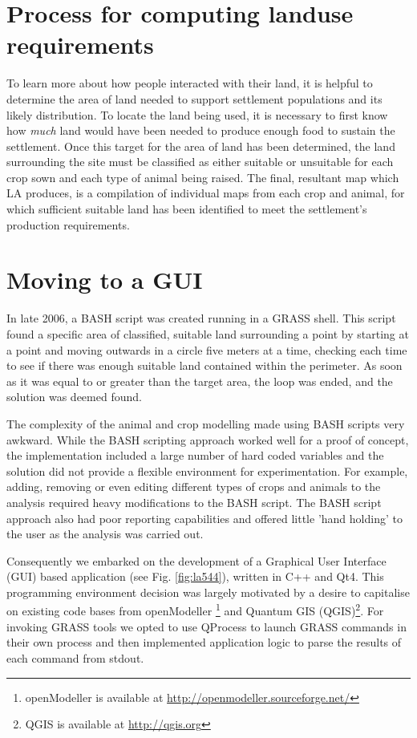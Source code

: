\section{Process for computing landuse requirements} 
\label{sec:EarlyAttempts} 
  To learn more about how people interacted with their land, it is
  helpful to determine the area of land needed to support settlement
  populations and its likely distribution.  To locate the land being used, it is
  necessary to first know how \textit{much} land would have been needed to
  produce enough food to sustain the settlement.  Once this target for the area of land
  has been determined, the land surrounding the site must be classified as
  either suitable or unsuitable for each crop sown and each type of animal being
  raised.  The final, resultant map which LA produces, is a compilation of individual
  maps from each crop and animal, for which sufficient suitable land has been
  identified to meet the settlement's production requirements.

\section{Moving to a GUI} \label{GUI} 
  In late 2006, a BASH script was created running in a GRASS shell. This script
  found a specific area of classified, suitable land surrounding a point by
  starting at a point and moving outwards in a circle five meters at a time,
  checking each time to see if there was enough suitable land contained within
  the perimeter. As soon as it was equal to or greater than the target area, the
  loop was ended, and the solution was deemed found.
  
  The complexity of the animal and crop modelling made using BASH scripts very
  awkward.  While the BASH scripting approach worked well for a proof of
  concept, the implementation included a large number of hard coded variables and the
  solution did not provide a flexible environment for experimentation. For
  example, adding, removing or even editing different types of crops and animals
  to the analysis required heavy modifications to the BASH script.  The BASH
  script approach also had poor reporting capabilities and offered
  little 'hand holding' to the user as the analysis was carried out.
  
  Consequently we embarked on the development of a Graphical User Interface (GUI)
  based application (see Fig. \ref{fig:la544}), written in C++ and Qt4. This
  programming environment decision was largely motivated by a desire to
  capitalise on existing code bases from openModeller \footnote{openModeller is
  available at \url{http://openmodeller.sourceforge.net/}} and Quantum GIS
  (QGIS)\footnote{QGIS is available at \url{http://qgis.org}}.  For invoking
  GRASS tools we opted to use QProcess to launch GRASS commands in their own
  process and then implemented application logic to parse the results of each
  command from stdout.

